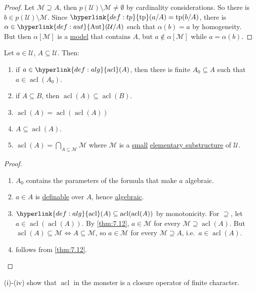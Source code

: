 \documentclass{article}
\DeclareMathOperator{\Aut}{Aut}
\DeclareMathOperator{\tp}{tp}
\DeclareMathOperator{\acl}{acl}
\begin{document}
\begin{proof}
  Let $\mathcal{M} \supseteq A$, then $p(\mathcal{U}) \setminus \mathcal{M} \neq \emptyset$ by cardinality considerations.
  So there is $b \in p(\mathcal{U}) \setminus \mathcal{M}$.
  Since $\hyperlink{def:tp}{\tp}(a/A) = \tp(b/A)$, there is $\alpha \in \hyperlink{def:aut}{\Aut}(\mathcal{U}/A)$ such that $\alpha(b) = a$ by homogeneity.
  But then $\alpha[\mathcal{M}]$ is a \hyperlink{def:model}{model} that contains $A$, but $a \notin \alpha[\mathcal{M}]$ while $a = \alpha(b)$.
\end{proof}

\begin{nprop}\label{prop:7.13}
  Let $a \in \mathcal{U}$, $A \subseteq \mathcal{U}$. Then:
  \begin{enumerate}[label=(\roman*)]
    \item if $a \in \hyperlink{def:alg}{\acl}(A)$, then there is finite $A_0 \subseteq A$ such that $a \in \acl(A_0)$.
    \item if $A \subseteq B$, then $\acl(A) \subseteq \acl(B)$.
    \item $\acl(A) = \acl(\acl(A))$
    \item $A \subseteq \acl(A)$.
    \item $\acl(A) = \bigcap_{A \subseteq \mathcal{M}} \mathcal{M}$
      where $\mathcal{M}$ is a \hyperlink{def:small}{small} \hyperlink{def:elsubs}{elementary substructure} of $\mathcal{U}$.
  \end{enumerate}
\end{nprop}
\begin{proof}\leavevmode
  \begin{enumerate}[label=(\roman*)]
    \item[(i)] $A_0$ contains the parameters of the formula that make $a$ algebraic.
    \item[(iv)] $a \in A$ is \hyperlink{def:def}{definable} over $A$, hence \hyperlink{def:alg}{algebraic}.
    \item[(iii)] $\hyperlink{def:alg}{\acl}(A) \subseteq \acl(\acl(A))$ by monotonicity.
      For $\supseteq$, let $a \in \acl(\acl(A))$. By \cref{thm:7.12}, $a \in \mathcal{M}$ for every $\mathcal{M} \supseteq \acl(A)$.
      But $\acl(A) \subseteq \mathcal{M} \iff A \subseteq \mathcal{M}$, so $a \in \mathcal{M}$ for every $\mathcal{M} \supseteq A$, i.e.\ $a \in \acl(A)$.
      \item[(v)] follows from \cref{thm:7.12}. \qedhere
  \end{enumerate}
\end{proof}
\begin{remark}
(i)-(iv) show that $\acl$ in the monster is a closure operator of finite character.
\end{remark}
\end{document}
